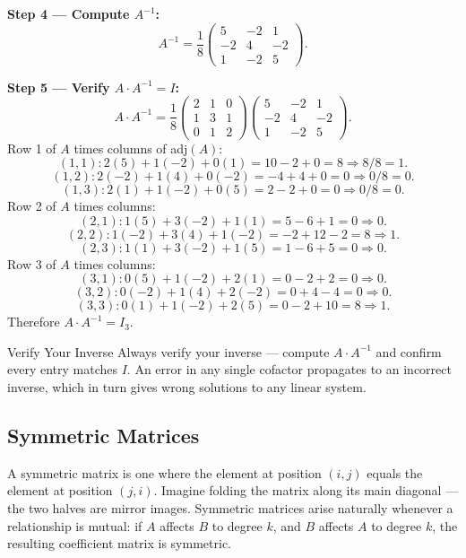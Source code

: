 \documentclass[12pt,a4paper]{article}
\begin{document}
\textbf{Step 4 --- Compute $A^{-1}$:}
\[
A^{-1} = \frac{1}{8}\begin{pmatrix} 5 & -2 & 1 \\ -2 & 4 & -2 \\ 1 & -2 & 5 \end{pmatrix}.
\]

\textbf{Step 5 --- Verify $A \cdot A^{-1} = I$:}
\[
A \cdot A^{-1} = \frac{1}{8}\begin{pmatrix}2&1&0\\1&3&1\\0&1&2\end{pmatrix}\begin{pmatrix}5&-2&1\\-2&4&-2\\1&-2&5\end{pmatrix}.
\]
Row 1 of $A$ times columns of adj$(A)$:
\[
(1,1): 2(5)+1(-2)+0(1) = 10-2+0 = 8 \Rightarrow 8/8 = 1.
\]
\[
(1,2): 2(-2)+1(4)+0(-2) = -4+4+0 = 0 \Rightarrow 0/8 = 0.
\]
\[
(1,3): 2(1)+1(-2)+0(5) = 2-2+0 = 0 \Rightarrow 0/8 = 0.
\]
Row 2 of $A$ times columns:
\[
(2,1): 1(5)+3(-2)+1(1) = 5-6+1 = 0 \Rightarrow 0.
\]
\[
(2,2): 1(-2)+3(4)+1(-2) = -2+12-2 = 8 \Rightarrow 1.
\]
\[
(2,3): 1(1)+3(-2)+1(5) = 1-6+5 = 0 \Rightarrow 0.
\]
Row 3 of $A$ times columns:
\[
(3,1): 0(5)+1(-2)+2(1) = 0-2+2 = 0 \Rightarrow 0.
\]
\[
(3,2): 0(-2)+1(4)+2(-2) = 0+4-4 = 0 \Rightarrow 0.
\]
\[
(3,3): 0(1)+1(-2)+2(5) = 0-2+10 = 8 \Rightarrow 1.
\]
Therefore $A \cdot A^{-1} = I_3$. \checkmark

\begin{learnbox}{Verify Your Inverse}
Always verify your inverse --- compute $A \cdot A^{-1}$ and confirm every entry matches $I$. An error in any single cofactor propagates to an incorrect inverse, which in turn gives wrong solutions to any linear system.
\end{learnbox}

\subsection{Symmetric Matrices}

A symmetric matrix is one where the element at position $(i, j)$ equals the element at position $(j, i)$. Imagine folding the matrix along its main diagonal --- the two halves are mirror images. Symmetric matrices arise naturally whenever a relationship is mutual: if $A$ affects $B$ to degree $k$, and $B$ affects $A$ to degree $k$, the resulting coefficient matrix is symmetric.
\end{document}
